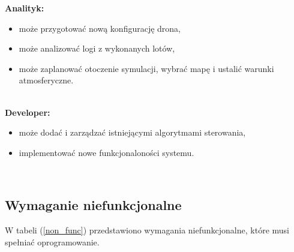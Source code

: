\documentclass[15pt]{sprawozdanie}
\begin{document}
\textbf{Analityk:}
\begin{itemize}[noitemsep,nolistsep]
	\item może przygotować nową konfigurację drona,
	\item może analizować logi z wykonanych lotów,
	\item może zaplanować otoczenie symulacji, wybrać mapę i ustalić warunki atmosferyczne.
\end{itemize}
\ \\

\textbf{Developer:}
\begin{itemize}[noitemsep,nolistsep]
	\item może dodać i zarządzać istniejącymi algorytmami sterowania,
	\item implementować nowe funkcjonaloności systemu.
\end{itemize}
\ \\


\newpage
\subsection{Wymaganie niefunkcjonalne}

W tabeli (\ref{non_func}) przedstawiono wymagania niefunkcjonalne, które musi spełniać oprogramowanie.
\end{document}
